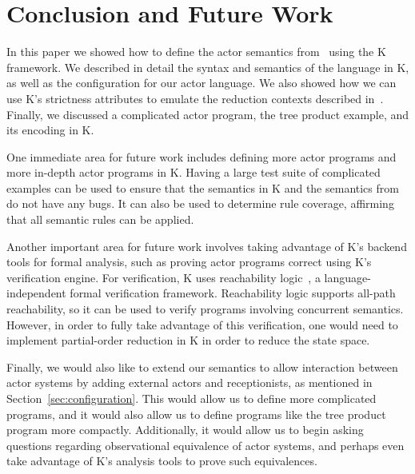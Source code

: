 \documentclass{llncs}
\begin{document}
\section{Conclusion and Future Work}

In this paper we showed how to define the actor semantics from~\cite{actor} using the
K framework. We described in detail the syntax and semantics of the language in
K, as well as the configuration for our actor language. We also showed how we
can use K's strictness attributes to emulate the reduction contexts described
in~\cite{actor}. Finally, we discussed a complicated actor program, the tree product
example, and its encoding in K.

One immediate area for future work includes defining more actor programs and
more in-depth actor programs in K. Having a large test suite of complicated
examples can be used to ensure that the semantics in K and the semantics
from~\cite{actor} do not have any bugs. It can also be used to determine rule
coverage, affirming that all semantic rules can be applied.

Another important area for future work involves taking advantage of K's
backend tools for formal analysis, such as proving actor programs correct using
K's verification engine. For verification, K uses reachability logic~\cite{reachabilitylogic}, a
language-independent formal verification framework. Reachability logic supports
all-path reachability, so it can be used to verify programs involving concurrent
semantics. However, in order to fully take advantage of this verification, one
would need to implement partial-order reduction in K in order to reduce the
state space.

Finally, we would also like to extend our semantics to allow interaction between
actor systems by adding external actors and receptionists, as mentioned in
Section~\ref{sec:configuration}. This would allow us to define more complicated
programs, and it would also allow us to define programs like the tree product
program more compactly. Additionally, it would allow us to begin asking
questions regarding observational equivalence of actor systems, and perhaps even
take advantage of K's analysis tools to prove such equivalences.

%
%



\end{document}
